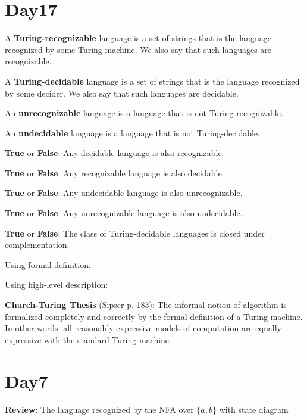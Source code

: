 \documentclass[12pt, oneside]{article}
\begin{document}
 \vfill
\section*{Day17}




A {\bf Turing-recognizable} language is a set of strings that 
is the language recognized by some Turing machine. We also 
say that such languages are recognizable.

A {\bf Turing-decidable} language is a set of strings that 
is the language recognized by some decider. We also 
say that such languages are decidable.


An {\bf unrecognizable} language is a language that is not Turing-recognizable.

An {\bf undecidable} language is a language that is not Turing-decidable.

\vfill

{\bf  True} or {\bf False}: Any  decidable language  is  also  recognizable.

\vfill

{\bf  True} or {\bf False}: Any  recognizable language  is  also  decidable.

\vfill

{\bf  True} or {\bf False}: Any  undecidable language  is  also  unrecognizable.

\vfill

{\bf  True} or {\bf False}: Any  unrecognizable language  is  also  undecidable.

\vfill

\newpage


{\bf True} or {\bf False}: The class of Turing-decidable languages is closed under complementation.

\vfill

Using formal definition:
\vfill

Using high-level description:
\vfill


{\bf  Church-Turing Thesis} (Sipser p. 183): The informal notion of algorithm is formalized completely  and correctly by the 
formal definition of a  Turing machine. In other words: all reasonably expressive models of 
computation are equally expressive with the standard Turing machine.
 \vfill
\section*{Day7}


{\bf Review}: The language recognized by the NFA over $\{a,b\}$ with state diagram
\end{document}
